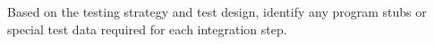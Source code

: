 Based on the testing strategy and test design, identify any program stubs or special test data required for each integration step.
